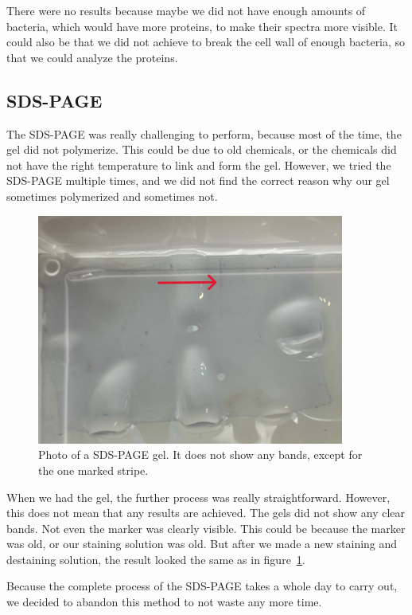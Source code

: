 There were no results because maybe we did not have enough amounts of bacteria, which would have more proteins, to make their spectra more visible.
It could also be that we did not achieve to break the cell wall of enough bacteria, so that we could analyze the proteins.

\subsection{SDS-PAGE}

The SDS-PAGE was really challenging to perform, because most of the time, the gel did not polymerize.
This could be due to old chemicals, or the chemicals did not have the right temperature to link and form the gel.
However, we tried the SDS-PAGE multiple times, and we did not find the correct reason why our gel sometimes polymerized and sometimes not.

\begin{figure}[H]
    \centering
    \includegraphics[width=0.9\textwidth]{./media/images/sdspage}
    \caption{Photo of a SDS-PAGE gel. It does not show any bands, except for the one marked stripe.}
    \label{fig:sds_page_result}
\end{figure}

When we had the gel, the further process was really straightforward.
However, this does not mean that any results are achieved.
The gels did not show any clear bands.
Not even the marker was clearly visible.
This could be because the marker was old, or our staining solution was old.
But after we made a new staining and destaining solution, the result looked the same as in figure~\ref{fig:sds_page_result}.

Because the complete process of the SDS-PAGE takes a whole day to carry out, we decided to abandon this method to not waste any more time.

